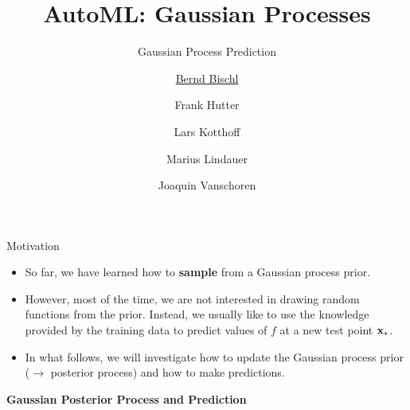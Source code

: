 



\newcommand{\lz}{\vspace{0.5cm}}
\newcommand{\thetab}{\bm{\weights}}
\newcommand{\zero}{\mathbf{0}}
\newcommand{\Xmat}{\mathbf{X}}
\newcommand{\ydat}{\mathbf{y}}
\newcommand{\id}{\boldsymbol{I}}
\newcommand{\Amat}{\mathbf{A}}
\newcommand{\Xspace}{\mathcal{X}}                                           
\newcommand{\Yspace}{\mathcal{Y}}
\newcommand{\ls}{\ell}
\newcommand{\natnum}{\mathbb{N}}
\newcommand{\intnum}{\mathbb{Z}}
\newcommand{\Kmat}{\bm{K}}


\usepackage{fontawesome}
\usepackage{dirtytalk}
\usepackage{csquotes}

\def\argmin{\mathop{\sf arg\,min}}   






\title[AutoML: GPs]{AutoML: Gaussian Processes} %
\subtitle{Gaussian Process Prediction} %
\author[Marius Lindauer]{\underline{Bernd Bischl} \and Frank Hutter \and Lars Kotthoff\newline \and Marius Lindauer \and Joaquin Vanschoren}
\institute{}
\date{}





\maketitle



\begin{frame}[c]{Motivation}

\begin{itemize}

\item So far, we have learned how to \textbf{sample} from a Gaussian process prior.
\lz
\item However, most of the time, we are not interested in drawing random functions from the prior. Instead, we usually like to use the knowledge provided by the training data to predict values of $f$ at a new test point $\mathbf{x}_*$. 
\lz
\item In what follows, we will investigate how to update the Gaussian process prior ($\to$ posterior process) and how to make predictions.


\end{itemize}


\end{frame}
\begin{frame}[c]{}
\centering
\huge
\textbf{Gaussian Posterior Process and Prediction}
\end{frame}



